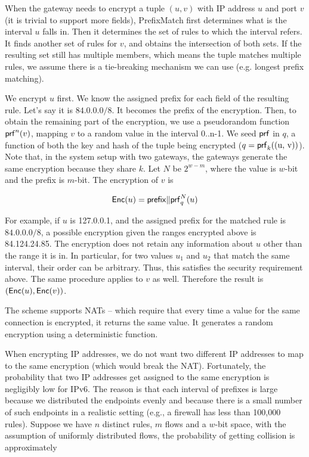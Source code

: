 When the gateway needs to encrypt a tuple $(u, v)$ with IP address $u$ and port $v$ (it is trivial to support more fields), PrefixMatch first determines what is the interval $u$ falls in. Then it determines the set of rules to which the interval refers. It finds another set of rules for $v$, and obtains the intersection of both sets. If the resulting set still has multiple members, which means the tuple matches multiple rules, we assume there is a tie-breaking mechanism we can use (e.g. longest prefix matching). 

We encrypt $u$ first. We know the assigned prefix for each field of the resulting rule. Let's say it is $84.0.0.0/8$. It becomes the prefix of the encryption. Then, to obtain the remaining part of the encryption, we use a pseudorandom function $\mathsf{prf}^n(v)$, mapping $v$ to a random value in the interval 0..n-1. We seed $\mathsf{prf}$ in $q$, a function of both the key and hash of the tuple being encrypted ($q = \mathsf{prf}_k(\text{(u, v)})$). Note that, in the system setup with two gateways, the gateways generate the same encryption because they share $k$. Let $N$ be $2^{w-m}$, where the value is $w$-bit and the prefix is $m$-bit. The encryption of $v$ is

\begin{equation}
\mathsf{Enc}(u) = \mathsf{prefix} \Vert \mathsf{prf}_q^N(u)
\end{equation}

For example, if $u$ is 127.0.0.1, and the assigned prefix for the matched rule is $84.0.0.0/8$, a possible encryption given the ranges encrypted above is 84.124.24.85. The encryption does not retain any information about $u$ other than the range it is in. In particular, for two values $u_1$ and $u_2$ that match the same interval, their order can be arbitrary. Thus, this satisfies the security requirement above. The same procedure applies to $v$ as well. Therefore the result is $(\mathsf{Enc}(u), \mathsf{Enc}(v))$.

The scheme supports NATs -- which require that every time a value for the same connection is encrypted, it returns the same value. It generates a random encryption using a deterministic function. 

When encrypting IP addresses, we do not want two different IP addresses to map to the same encryption (which would break the NAT). Fortunately, the probability that two IP addresses get assigned to the same encryption is negligibly low for IPv6.  The reason is that each interval of prefixes is large because we distributed the endpoints evenly and because there is a small number of such endpoints in a realistic setting (e.g., a firewall has less than 100,000 rules). Suppose we have $n$ distinct rules, $m$ flows and a $w$-bit space, with the assumption of uniformly distributed flows, the probability of getting collision is approximately 

